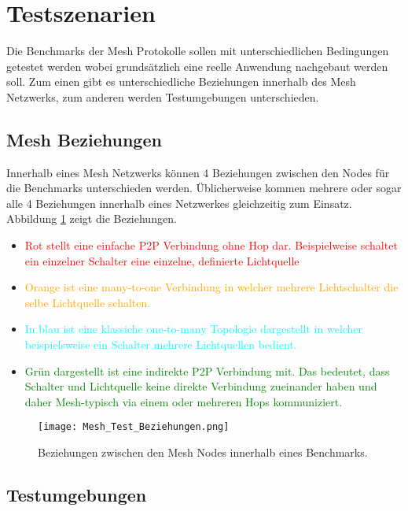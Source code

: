 	\clearpage
\section{Testszenarien}\label{sec:Testszenarien}

Die Benchmarks der Mesh Protokolle sollen mit unterschiedlichen Bedingungen getestet werden wobei grundsätzlich eine reelle Anwendung nachgebaut werden soll. Zum einen gibt es unterschiedliche Beziehungen innerhalb des Mesh Netzwerks, zum anderen werden Testumgebungen unterschieden.

\subsection{Mesh Beziehungen}\label{subsec:MeshBeziehungen}

Innerhalb eines Mesh Netzwerks können 4 Beziehungen zwischen den Nodes für die Benchmarks unterschieden werden. Üblicherweise kommen mehrere oder sogar alle 4 Beziehungen innerhalb eines Netzwerkes gleichzeitig zum Einsatz. Abbildung \ref{fig:MeshTestBeziehungen} zeigt die Beziehungen.

\begin{itemize}
 	\item \textcolor{red}{Rot stellt eine einfache P2P Verbindung ohne Hop dar. Beispielweise schaltet ein einzelner Schalter eine einzelne, definierte Lichtquelle}
 	\item \textcolor{orange}{Orange ist eine many-to-one Verbindung in welcher mehrere Lichtschalter die selbe Lichtquelle schalten.}
 	\item \textcolor{cyan}{In blau ist eine klassiche one-to-many Topologie dargestellt in welcher beispielsweise ein Schalter mehrere Lichtquellen bedient.}
 	 \item \textcolor{green}{Grün dargestellt ist eine indirekte P2P Verbindung mit. Das bedeutet, dass Schalter und Lichtquelle keine direkte Verbindung zueinander haben und daher Mesh-typisch via einem oder mehreren Hops kommuniziert.}
\end{itemize}


\begin{figure}[H]
	\centering
	\texttt{[image: Mesh\_Test\_Beziehungen.png]}
	\caption{Beziehungen zwischen den Mesh Nodes innerhalb eines Benchmarks.}\label{fig:MeshTestBeziehungen}
\end{figure}


\subsection{Testumgebungen}\label{subsec:Testumgebungen}

